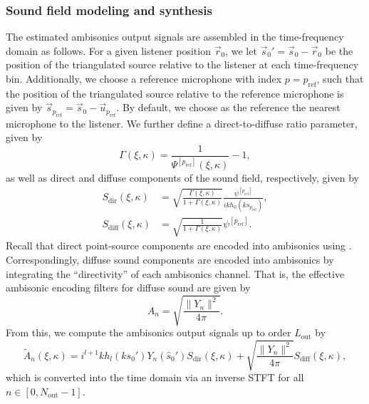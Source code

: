 \subsubsection{Sound field modeling and synthesis}
The estimated ambisonics output signals are assembled in the time-frequency domain as follows.
For a given listener position $\vec{r}_0$, we let $\vec{s}_0{}' = \vec{s}_0 - \vec{r}_0$ be the position of the triangulated source relative to the listener at each time-frequency bin.
Additionally, we choose a reference microphone with index $p = p_\textrm{ref}$, such that the position of the triangulated source relative to the reference microphone is given by $\vec{s}_{p_\textrm{ref}} = \vec{s}_0 - \vec{u}_{p_\textrm{ref}}$.
By default, we choose as the reference the nearest microphone to the listener.
We further define a direct-to-diffuse ratio parameter, given by
\begin{equation}\label{eq:03_Navigation_Techniques:Direct-to-Diffuse_Ratio}
\Gamma(\xi,\kappa) = \frac{1}{\Psi^{[p_\textrm{ref}]}(\xi,\kappa)} - 1,
\end{equation}
as well as direct and diffuse components of the sound field, respectively, given by
\begin{align}
S_\textrm{dir}(\xi,\kappa) &= \sqrt{\frac{\Gamma(\xi,\kappa)}{1 + \Gamma(\xi,\kappa)}} \frac{\psi^{[p_\textrm{ref}]}}{i k h_0(k s_{p_\textrm{ref}})}, \\
S_\textrm{diff}(\xi,\kappa) &= \sqrt{\frac{1}{1 + \Gamma(\xi,\kappa)}} \psi^{[p_\textrm{ref}]}.
\end{align}
Recall that direct point-source components are encoded into ambisonics using .
Correspondingly, diffuse sound components are encoded into ambisonics by integrating the ``directivity'' of each ambisonics channel.
That is, the effective ambisonic encoding filters for diffuse sound are given by
\begin{equation}
A_n = \sqrt{\frac{\|Y_n\|^2}{4\pi}}.
\end{equation}
From this, we compute the ambisonics output signals up to order $L_\text{out}$ by
\begin{equation}\label{eq:03_Navigation_Techniques:Thiergart_Synthesis}
\tilde{A}_n(\xi,\kappa) = i^{l+1} k h_l(k s_0{}') Y_n(\hat{s}_0{}') S_\textrm{dir}(\xi,\kappa) + \sqrt{\frac{\|Y_n\|^2}{4\pi}} S_\textrm{diff}(\xi,\kappa),
\end{equation}
which is converted into the time domain via an inverse STFT for all $n \in [0, N_\text{out}-1]$.